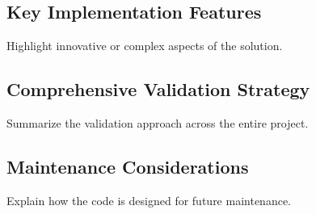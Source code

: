 \subsection{Key Implementation Features}
Highlight innovative or complex aspects of the solution.

\subsection{Comprehensive Validation Strategy}
Summarize the validation approach across the entire project.

\subsection{Maintenance Considerations}
Explain how the code is designed for future maintenance.

